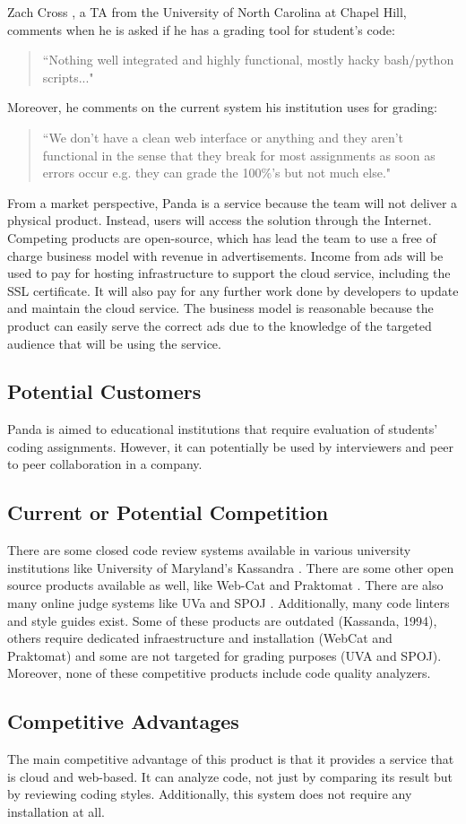 
Zach Cross \cite{Zach}, a TA from the
University of North Carolina at Chapel Hill, comments when he is asked if he has
a grading tool for student's code: \begin{quote} ``Nothing well integrated and
highly functional, mostly hacky bash/python scripts..." \end{quote} Moreover, he
comments on the current system his institution uses for grading: \begin{quote}
``We don't have a clean web interface or anything and they aren't functional in
the sense that they break for most assignments as soon as errors occur e.g. they
can grade the 100\%'s but not much else." \end{quote}

From a market perspective, Panda is a service because the team
will not deliver a physical product. Instead, users will access the solution
through the Internet. Competing products are open-source, which has lead the
team to use a free of charge business model with revenue in advertisements.
Income from ads will be used to pay for hosting infrastructure to support the
cloud service, including the SSL certificate. It will also pay for any further
work done by developers to update and maintain the cloud service. The business
model is reasonable because the product can easily serve the correct ads due to
the knowledge of the targeted audience that will be using the service.

\subsection{Potential Customers}

Panda is aimed to educational institutions that
require evaluation of students' coding assignments. However, it can potentially
be used by interviewers and peer to peer collaboration in a company.

\subsection{Current or Potential Competition}

There are some closed code review systems available in various university
institutions like University of Maryland's Kassandra \cite{Matt1994}. There are
some other open source products available as well, like Web-Cat \cite{WebCat}
and Praktomat \cite{Praktomat}. There are also many online judge systems like
UVa \cite{UVA} and SPOJ \cite{SPOJ}. Additionally, many code linters and style
guides exist. Some of these products are outdated (Kassanda, 1994), others
require dedicated infraestructure and installation (WebCat and Praktomat) and
some are not targeted for grading purposes (UVA and SPOJ). Moreover,
none of these competitive products include code quality analyzers.

\subsection{Competitive Advantages}

The main competitive advantage of this product is that it provides a service
that is cloud and web-based. It can analyze code, not just by comparing its
result but by reviewing coding styles. Additionally, this system does not
require any installation at all.
